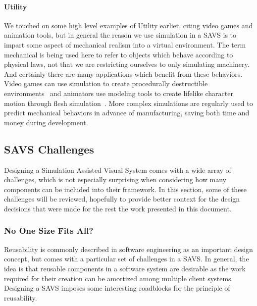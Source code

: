 \paragraph{Utility} We touched on some high level examples of Utility
  earlier, citing video games and animation tools, but in general the
  reason we use simulation in a SAVS is to impart some aspect of
  mechanical realism into a virtual environment. The term mechanical
  is being used here to refer to objects which behave according to
  physical laws, not that we are restricting ourselves to only
  simulating machinery. And certainly there are many applications
  which benefit from these behaviors. Video games can use simulation
  to create procedurally destructible environments~\citep{ParkeO:2009}
  and animators use modeling tools to create lifelike character motion
  through flesh simulation~\citep{McAdaST:2010}. More complex
  simulations are regularly used to predict mechanical behaviors in
  advance of manufacturing, saving both time and money during
  development.
      

\subsection{SAVS Challenges}

Designing a Simulation Assisted Visual System comes with a wide
array of challenges, which is not especially surprising when
considering how many components can be included into their
framework. In this section, some of these challenges will be reviewed,
hopefully to provide better context for the design decisions that were
made for the rest the work presented in this document.

\subsubsection{No One Size Fits All?}

Reusability is commonly described in software engineering as an
important design concept, but comes with a particular set of
challenges in a SAVS. In general, the idea is that reusable components
in a software system are desirable as the work required for their
creation can be amortized among multiple client systems.  Designing a
SAVS imposes some interesting roadblocks for the principle of
reusability.

